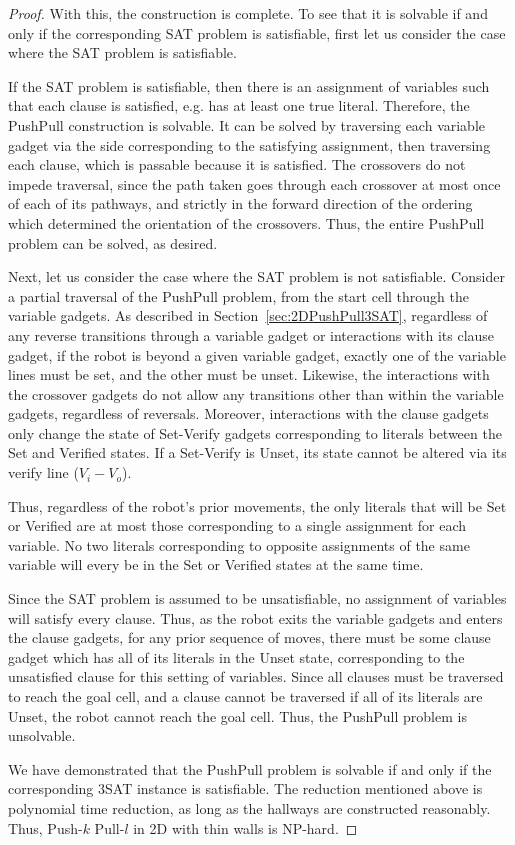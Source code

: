\begin{proof}
    With this, the construction is complete. To see that it is solvable if and only if the corresponding SAT problem is satisfiable, first let us consider the case where the SAT problem is satisfiable.

    If the SAT problem is satisfiable, then there is an assignment of variables such that each clause is satisfied, e.g. has at least one true literal. Therefore, the PushPull construction is solvable. It can be solved by traversing each variable gadget via the side corresponding to the satisfying assignment, then traversing each clause, which is passable because it is satisfied. The crossovers do not impede traversal, since the path taken goes through each crossover at most once of each of its pathways, and strictly in the forward direction of the ordering which determined the orientation of the crossovers. Thus, the entire PushPull problem can be solved, as desired.

    Next, let us consider the case where the SAT problem is not satisfiable. Consider a partial traversal of the PushPull problem, from the start cell through the variable gadgets. As described in Section~\ref{sec:2DPushPull3SAT}, regardless of any reverse transitions through a variable gadget or interactions with its clause gadget, if the robot is beyond a given variable gadget, exactly one of the variable lines must be set, and the other must be unset. Likewise, the interactions with the crossover gadgets do not allow any transitions other than within the variable gadgets, regardless of reversals. Moreover, interactions with the clause gadgets only change the state of Set-Verify gadgets corresponding to literals between the Set and Verified states. If a Set-Verify is Unset, its state cannot be altered via its verify line ($V_i - V_o$).

    Thus, regardless of the robot's prior movements, the only literals that will be Set or Verified are at most those corresponding to a single assignment for each variable. No two literals corresponding to opposite assignments of the same variable will every be in the Set or Verified states at the same time. 

    Since the SAT problem is assumed to be unsatisfiable, no assignment of variables will satisfy every clause. Thus, as the robot exits the variable gadgets and enters the clause gadgets, for any prior sequence of moves, there must be some clause gadget which has all of its literals in the Unset state, corresponding to the unsatisfied clause for this setting of variables. Since all clauses must be traversed to reach the goal cell, and a clause cannot be traversed if all of its literals are Unset, the robot cannot reach the goal cell. Thus, the PushPull problem is unsolvable.

    We have demonstrated that the PushPull problem is solvable if and only if the corresponding 3SAT instance is satisfiable. The reduction mentioned above is polynomial time reduction, as long as the hallways are constructed reasonably. Thus, Push-$k$ Pull-$l$ in 2D with thin walls is NP-hard.


\end{proof}



